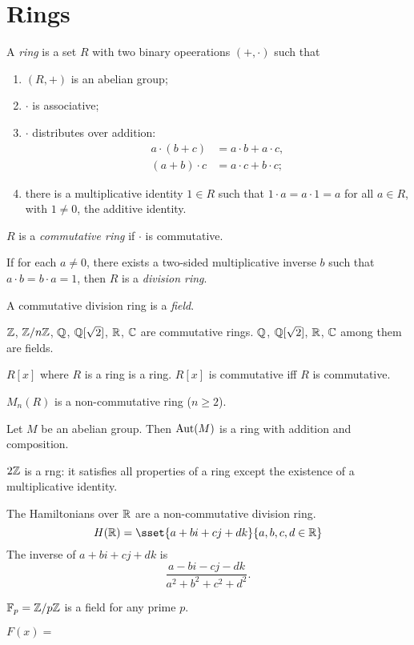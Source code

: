 \chapter{Rings} \label{chp:ring}
\begin{definition*}[ring] \label{def:ring}
    A \emph{ring} is a set $R$ with two binary opeerations $(+, \cdot)$
    such that
    \begin{enumerate}[label=\small(R\arabic*)]
        \item $(R, +)$ is an abelian group;
        \item $\cdot$ is associative;
        \item $\cdot$ distributes over addition: \begin{align*}
            a \cdot (b + c) &= a \cdot b + a \cdot c, \\
            (a + b) \cdot c &= a \cdot c + b \cdot c;
        \end{align*}
        \item there is a multiplicative identity $1 \in R$ such that
        $1 \cdot a = a \cdot 1 = a$ for all $a \in R$,
        with $1 \ne 0$, the additive identity.
    \end{enumerate}
    $R$ is a \emph{commutative ring} if $\cdot$ is commutative.

    If for each $a \ne 0$, there exists a two-sided multiplicative
    inverse $b$ such that $a \cdot b = b \cdot a = 1$, then $R$ is a
    \emph{division ring}.

    A commutative division ring is a \emph{field}.
\end{definition*}

\begin{examples}
    \item $\mathbb{Z}$, $\mathbb{Z}/n\mathbb{Z}$, $\mathbb{Q}$, $\mathbb{Q}[\sqrt 2]$, $\mathbb{R}$, $\mathbb{C}$ are commutative
        rings.
        $\mathbb{Q}$, $\mathbb{Q}[\sqrt 2]$, $\mathbb{R}$, $\mathbb{C}$ among them are fields.
    \item $R[x]$ where $R$ is a ring is a ring.
        $R[x]$ is commutative iff $R$ is commutative.
    \item $M_n(R)$ is a non-commutative ring ($n \ge 2$).
    \item Let $M$ be an abelian group.
        Then $\operatorname{Aut}(M)$ is a ring with addition and composition.
    \item $2\mathbb{Z}$ is a rng: it satisfies all properties of a ring except
        the existence of a multiplicative identity.
    \item The Hamiltonians over $\mathbb{R}$ are a non-commutative division ring. \[
        H(\R) = \sset{a + bi + cj + dk}{a, b, c, d \in \R}
    \] The inverse of $a + bi + cj + dk$ is \[
        \frac{a - bi - cj - dk}{a^2 + b^2 + c^2 + d^2}.
    \]
    \item $\mathbb{F}_p = \mathbb{Z}/p\mathbb{Z}$ is a field for any prime $p$.
    \item $F(x) = $ \TODO[what]
\end{examples}


